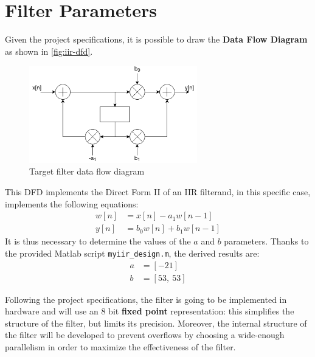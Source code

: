 \section{Filter Parameters}
Given the project specifications, it is possible to draw the \textbf{Data Flow Diagram} as shown in \autoref{fig:iir-dfd}.
\begin{figure}[htbp]
	\center
	\includegraphics[width=0.65\textwidth]{chapter1/images/iir-dfd.png}
	\caption{Target filter data flow diagram}
	\label{fig:iir-dfd}
\end{figure}

This DFD implements the Direct Form II of an IIR filterand, in this specific case, implements the following equations:
\begin{align}
	w[n] &= x[n] - a_1 w[n-1] 		\label{eqn:iir-1}\\
	y[n] &= b_0 w[n] + b_1 w[n-1]	\label{eqn:iir-2}
\end{align}
It is thus necessary to determine the values of the $a$ and $b$ parameters. Thanks to the provided Matlab script \texttt{myiir\_design.m}, the derived results are:
\begin{align}
    a &= [-21] \\
    b &= [53,\ 53]
\end{align}

Following the project specifications, the filter is going to be implemented in hardware and will use an 8 bit \textbf{fixed point} representation: this simplifies the structure of the filter, but limits its precision. Moreover, the internal structure of the filter will be developed to prevent overflows by choosing a wide-enough parallelism in order to maximize the effectiveness of the filter.
